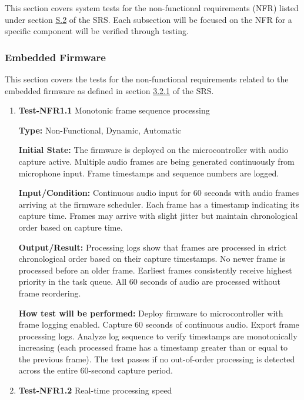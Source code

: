 \documentclass[12pt, titlepage]{article}
\begin{document}
This section covers system tests for the non-functional requirements (NFR)
listed under section \hyperref[SRS-sec:S.2]{S.2} of the SRS. Each subsection
will be focused on the NFR for a specific component will be verified through
testing.


\subsubsection{Embedded Firmware}

This section covers the tests for the non-functional requirements related to the
embedded firmware as defined in section \hyperref[SRS-sec:FR1]{3.2.1} of the
SRS.

\begin{enumerate}

\item{\textbf{Test-NFR1.1} Monotonic frame sequence processing\\}

\textbf{Type:} Non-Functional, Dynamic, Automatic
					
\textbf{Initial State:} 
The firmware is deployed on the microcontroller with audio capture active.
Multiple audio frames are being generated continuously from microphone input.
Frame timestamps and sequence numbers are logged.
					
\textbf{Input/Condition:} 
Continuous audio input for 60 seconds with audio frames arriving at the firmware
scheduler. Each frame has a timestamp indicating its capture time. Frames may
arrive with slight jitter but maintain chronological order based on capture
time.
					
\textbf{Output/Result:} 
Processing logs show that frames are processed in strict chronological order
based on their capture timestamps. No newer frame is processed before an older
frame. Earliest frames consistently receive highest priority in the task queue.
All 60 seconds of audio are processed without frame reordering.
					
\textbf{How test will be performed:} 
Deploy firmware to microcontroller with frame logging enabled. Capture 60
seconds of continuous audio. Export frame processing logs. Analyze log sequence
to verify timestamps are monotonically increasing (each processed frame has a
timestamp greater than or equal to the previous frame). The test passes if no
out-of-order processing is detected across the entire 60-second capture period.
					
\item{\textbf{Test-NFR1.2} Real-time processing speed\\}


\end{enumerate}
\end{document}
